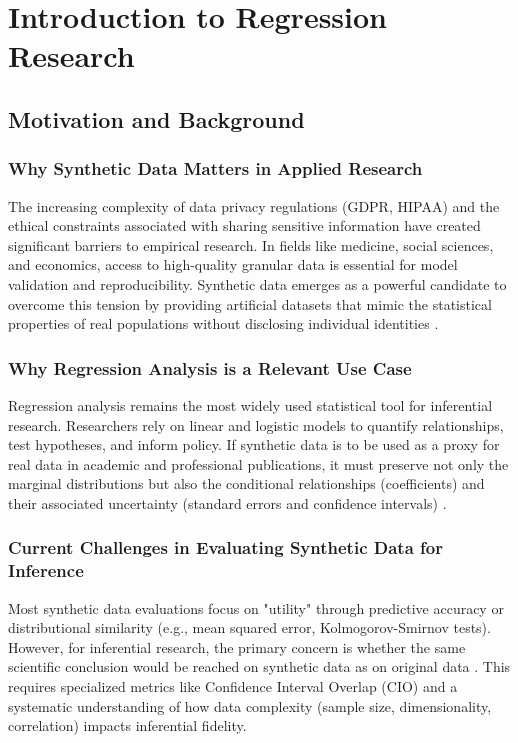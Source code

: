 \chapter{Introduction to Regression Research}
\label{chap:regression-introduction}

\section{Motivation and Background}
\label{sec:reg-motivation}

\subsection{Why Synthetic Data Matters in Applied Research}
The increasing complexity of data privacy regulations (GDPR, HIPAA) and the ethical constraints associated with sharing sensitive information have created significant barriers to empirical research. In fields like medicine, social sciences, and economics, access to high-quality granular data is essential for model validation and reproducibility. Synthetic data emerges as a powerful candidate to overcome this tension by providing artificial datasets that mimic the statistical properties of real populations without disclosing individual identities \cite{rubin1993, little1993}.

\subsection{Why Regression Analysis is a Relevant Use Case}
Regression analysis remains the most widely used statistical tool for inferential research. Researchers rely on linear and logistic models to quantify relationships, test hypotheses, and inform policy. If synthetic data is to be used as a proxy for real data in academic and professional publications, it must preserve not only the marginal distributions but also the conditional relationships (coefficients) and their associated uncertainty (standard errors and confidence intervals) \cite{reiter2003, drechsler2011}.

\subsection{Current Challenges in Evaluating Synthetic Data for Inference}
Most synthetic data evaluations focus on "utility" through predictive accuracy or distributional similarity (e.g., mean squared error, Kolmogorov-Smirnov tests). However, for inferential research, the primary concern is whether the same scientific conclusion would be reached on synthetic data as on original data \cite{snoke2018}. This requires specialized metrics like Confidence Interval Overlap (CIO) and a systematic understanding of how data complexity (sample size, dimensionality, correlation) impacts inferential fidelity.

